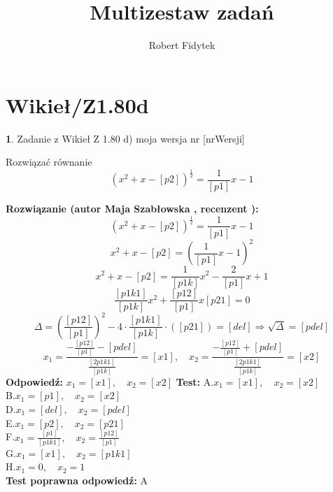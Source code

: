 \documentclass[12pt, a4paper]{article}
\title{Multizestaw zadań}
\author{Robert Fidytek}
\date{}
\theoremstyle{definition} %
\newtheorem{zad}{}
\newcommand{\kategoria}[1]{\section{#1}} %
\newcommand{\zadStart}[1]{\begin{zad}#1\newline} %
\newcommand{\zadStop}{\end{zad}}   %
\newcommand{\rozwStart}[2]{\noindent \textbf{Rozwiązanie (autor #1 , recenzent #2): }\newline} %
\newcommand{\rozwStop}{\newline}                                            %
\newcommand{\odpStart}{\noindent \textbf{Odpowiedź:}\newline}    %
\newcommand{\odpStop}{\newline}                                             %
\newcommand{\testStart}{\noindent \textbf{Test:}\newline} %
\newcommand{\testStop}{\newline} %
\newcommand{\kluczStart}{\noindent \textbf{Test poprawna odpowiedź:}\newline} %
\newcommand{\kluczStop}{\newline} %
\begin{document}
\maketitle


\kategoria{Wikieł/Z1.80d}
\zadStart{Zadanie z Wikieł Z 1.80 d)  moja wersja nr [nrWersji]}




Rozwiązać równanie 
$$(x^{2}+x-[p2])^{\frac{1}{2}}=\frac{1}{[p1]}x-1$$
\zadStop

\rozwStart{Maja Szabłowska}{}
$$(x^{2}+x-[p2])^{\frac{1}{2}}=\frac{1}{[p1]}x-1$$
$$x^{2}+x-[p2]=\left(\frac{1}{[p1]}x-1\right)^2$$
$$x^{2}+x-[p2]=\frac{1}{[p1k]}x^{2}-\frac{2}{[p1]}x+1$$
$$\frac{[p1k1]}{[p1k]}x^{2}+\frac{[p12]}{[p1]}x[p21]=0$$
$$\Delta=\left(\frac{[p12]}{[p1]}\right)^2 - 4\cdot\frac{[p1k1]}{[p1k]}\cdot([p21])=[del]\Rightarrow \sqrt{\Delta}=[pdel]$$
$$x_{1}=\frac{-\frac{[p12]}{[p1]}-[pdel]}{\frac{[2p1k1]}{[p1k]}}=[x1], \quad x_{2}=\frac{-\frac{[p12]}{[p1]}+[pdel]}{\frac{[2p1k1]}{[p1k]}}=[x2]$$
\rozwStop
\odpStart
$x_{1}=[x1], \quad x_{2}=[x2]$
\odpStop
\testStart
A.$x_{1}=[x1], \quad x_{2}=[x2]$\\
B.$x_{1}=[p1], \quad x_{2}=[x2]$\\
D.$x_{1}=[del], \quad x_{2}=[pdel]$\\
E.$x_{1}=[p2], \quad x_{2}=[p21]$\\
F.$x_{1}=\frac{[p1]}{[p1k1]}, \quad x_{2}=\frac{[p12]}{[p1]}$\\
G.$x_{1}=[x1], \quad x_{2}=[p1k1]$\\
H.$x_{1}=0, \quad x_{2}=1$\\
\testStop
\kluczStart
A
\kluczStop
\end{document}
